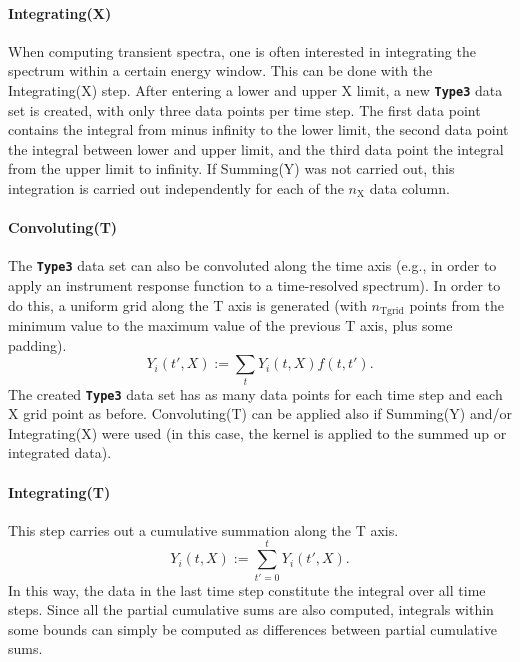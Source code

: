 \documentclass[a4paper,10pt,DIV=15,openany,twoside=false]{scrbook}
\newcommand{\ttt}[1]{\textbf{\texttt{#1}}}
\begin{document}
\paragraph{Integrating(X)}

When computing transient spectra, one is often interested in integrating the spectrum within a certain energy window.
This can be done with the Integrating(X) step.
After entering a lower and upper X limit, a new \ttt{Type3} data set is created, with only three data points per time step.
The first data point contains the integral from minus infinity to the lower limit, the second data point the integral between lower and upper limit, and the third data point the integral from the upper limit to infinity.
If Summing(Y) was not carried out, this integration is carried out independently for each of the $n_\text{X}$ data column.

\paragraph{Convoluting(T)}

The \ttt{Type3} data set can also be convoluted along the time axis (e.g., in order to apply an instrument response function to a time-resolved spectrum).
In order to do this, a uniform grid along the T axis is generated (with $n_\text{Tgrid}$ points from the minimum value to the maximum value of the previous T axis, plus some padding).
\begin{equation}
  Y_i(t',X):=\sum_{t} Y_i(t,X) f(t,t').
\end{equation}
The created \ttt{Type3} data set has as many data points for each time step and each X grid point as before.
Convoluting(T) can be applied also if Summing(Y) and/or Integrating(X) were used (in this case, the kernel is applied to the summed up or integrated data).

\paragraph{Integrating(T)}

This step carries out a cumulative summation along the T axis.
\begin{equation}
  Y_i(t,X):=\sum_{t'=0}^t Y_i(t',X).
\end{equation}
In this way, the data in the last time step constitute the integral over all time steps.
Since all the partial cumulative sums are also computed, integrals within some bounds can simply be computed as differences between partial cumulative sums.
\end{document}
